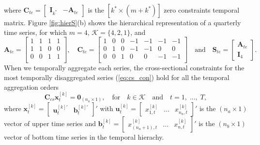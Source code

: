 \documentclass[a4paper,11pt]{article}
\newcommand{\bvet}{\bm{b}}
\newcommand{\uvet}{\bm{u}}
\newcommand{\xvet}{\bm{x}}
\newcommand{\Avet}{\bm{A}}
\newcommand{\Cvet}{\bm{C}}
\newcommand{\Ivet}{\bm{I}}
\newcommand{\Svet}{\bm{S}}
\newcommand{\Zerovet}{\bm{0}}
\theoremstyle{definition}
\begin{document}
where $\Cvet_{te} = \begin{bmatrix}\Ivet_{k^\ast} & -\Avet_{te}\end{bmatrix}$ is the $\left[k^\ast \times (m+k^\ast)\right]$ zero constraints temporal matrix. 
Figure \ref{fig:hierS}(b) shows the hierarchical representation of a quarterly time series, for which $m = 4$, $\mathcal{K} = \{4,2,1\}$, and 
$$
\Avet_{te} = \begin{bmatrix}
	1 & 1 & 1 & 1\\
	1 & 1 & 0 & 0\\
	0 & 0 & 1 & 1\\
\end{bmatrix}, \quad \Cvet_{te} = \begin{bmatrix}
	1 & 0 & 0 & -1 & -1 & -1 & -1\\
	0 & 1 & 0 & -1 & -1 & 0 & 0\\
	0 & 0 & 1 & 0 & 0 & -1 & -1\\
\end{bmatrix} \quad \mathrm{and} \quad \Svet_{te} = \begin{bmatrix}
	\Avet_{te} \\
	\Ivet_4
\end{bmatrix}.
$$ 
When we temporally aggregate each series, the cross-sectional constraints for the most temporally disaggregated series (\ref{eq:cs_con}) hold for all the temporal aggregation orders 
\begin{equation}
\label{eq:cs_con2}
	\Cvet_{cs}\xvet^{[k]}_t = \Zerovet_{(n_a \times 1)}, \quad \mathrm{for} \quad k \in \mathcal{K} \quad \mathrm{and} \quad t = 1, \;..., \;T,
\end{equation}
where $\xvet_t^{[k]} = \begin{bmatrix}
 \uvet_t^{[k]\prime} & \bvet_t^{[k]\prime}
 \end{bmatrix}'$ with $\uvet^{[k]}_t = \begin{bmatrix} x^{[k]}_{1,t} & \dots & x^{[k]}_{n_a,t}
\end{bmatrix}'$ is the $(n_a \times 1)$ vector of upper time series and $\bvet^{[k]}_t = \begin{bmatrix} x^{[k]}_{(n_a+1),t} & \dots & x^{[k]}_{n,t} \end{bmatrix}'$ is the $(n_b \times 1)$ vector of bottom time series in the temporal hierachy.


\end{document}
